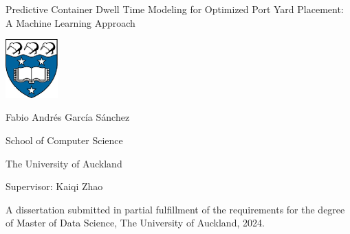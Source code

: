 \documentclass[11pt]{book}
\begin{document}
	\pagestyle{empty}

	\begin{center}

		\vspace{1cm}

		{\Huge Predictive Container Dwell Time Modeling for Optimized Port Yard Placement: A Machine Learning Approach}

		\vspace{15mm}

		\includegraphics[width=2cm]{images/logo}

		\vspace{45mm}

		{\Large       Fabio Andrés García Sánchez}

		\vspace{1ex}

		School of Computer Science

		The University of Auckland

		\vspace{5ex}

		Supervisor: Kaiqi Zhao

		\vspace{30mm}

		A dissertation submitted in partial fulfillment of the requirements for the degree of Master of
		Data Science, The University of Auckland, 2024.

	\end{center}


	

	

	\tableofcontents

	

	

	

	

	

	

	

	

	\printbibliography
\end{document}
